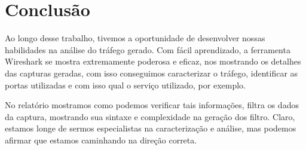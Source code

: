 \documentclass{llncs}
\begin{document}
  \newpage

  \section{Conclusão}
    \begin{flushleft}
      Ao longo desse trabalho, tivemos a oportunidade de desenvolver nossas habilidades na análise do tráfego gerado.
      Com fácil aprendizado, a ferramenta Wireshark se mostra extremamente poderosa e eficaz, nos mostrando os detalhes das capturas geradas, com isso conseguimos caracterizar o tráfego, identificar as portas utilizadas e com isso qual o serviço utilizado, por exemplo.
      \par No relatório mostramos como podemos verificar tais informações, filtra os dados da captura, mostrando sua sintaxe e complexidade na geração dos filtro.
      Claro, estamos longe de sermos especialistas na caracterização e análise, mas podemos afirmar que estamos caminhando na direção correta.

    \end{flushleft}
\end{document}
